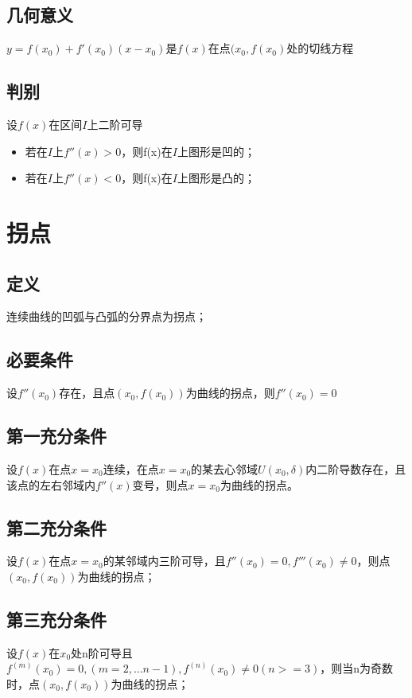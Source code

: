 \subsection{几何意义}
\(y = f(x_0) + f'(x_0)(x - x_0)\)是\(f(x)\)在点\((x_0, f(x_0)\)处的切线方程


\subsection{判别}
设\(f(x)\)在区间\(I\)上二阶可导\begin{itemize}
    \item 若在\(I\)上\(f''(x) > 0\)，则f(x)在\(I\)上图形是凹的；
    \item 若在\(I\)上\(f''(x) < 0\)，则f(x)在\(I\)上图形是凸的；
\end{itemize}


\section{拐点}
\subsection{定义}
连续曲线的凹弧与凸弧的分界点为拐点；

\subsection{必要条件}
设\(f''(x_0)\)存在，且点\((x_0, f(x_0))\)为曲线的拐点，则\(f''(x_0) = 0\)


\subsection{第一充分条件}
设\(f(x)\)在点\(x = x_0\)连续，在点\(x = x_0\)的某去心邻域\(U(x_0, \delta)\)内二阶导数存在，且该点的左右邻域内\(f''(x)\)变号，则点\(x = x_0\)为曲线的拐点。


\subsection{第二充分条件}
设\(f(x)\)在点\(x = x_0\)的某邻域内三阶可导，且\(f''(x_0) = 0, f'''(x_0) \neq 0\)，则点\((x_0, f(x_0))\)为曲线的拐点；


\subsection{第三充分条件}
设\(f(x)\)在\(x_0\)处n阶可导且\(f^{(m)}(x_0) = 0, (m = 2, ... n - 1), f^{(n)}(x_0) \neq 0(n >= 3)\)，则当n为奇数时，点\((x_0, f(x_0))\)为曲线的拐点；


